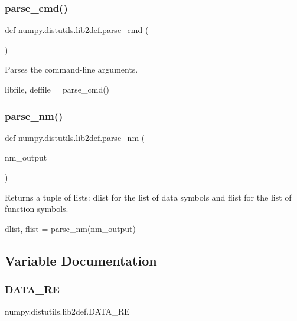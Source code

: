 \subsubsection{\texorpdfstring{parse\+\_\+cmd()}{parse\_cmd()}}
{\footnotesize\ttfamily def numpy.\+distutils.\+lib2def.\+parse\+\_\+cmd (\begin{DoxyParamCaption}{ }\end{DoxyParamCaption})}

\begin{DoxyVerb}Parses the command-line arguments.

libfile, deffile = parse_cmd()\end{DoxyVerb}
 \mbox{\label{namespacenumpy_1_1distutils_1_1lib2def_a8c398cc91413881af79a84352fc29564}} 
\subsubsection{\texorpdfstring{parse\+\_\+nm()}{parse\_nm()}}
{\footnotesize\ttfamily def numpy.\+distutils.\+lib2def.\+parse\+\_\+nm (\begin{DoxyParamCaption}\item[{}]{nm\+\_\+output }\end{DoxyParamCaption})}

\begin{DoxyVerb}Returns a tuple of lists: dlist for the list of data
symbols and flist for the list of function symbols.

dlist, flist = parse_nm(nm_output)\end{DoxyVerb}
 

\subsection{Variable Documentation}
\mbox{\label{namespacenumpy_1_1distutils_1_1lib2def_a723c30016c86753bbfe3c7cb0f15cc3c}} 
\subsubsection{\texorpdfstring{D\+A\+T\+A\+\_\+\+RE}{DATA\_RE}}
{\footnotesize\ttfamily numpy.\+distutils.\+lib2def.\+D\+A\+T\+A\+\_\+\+RE}

